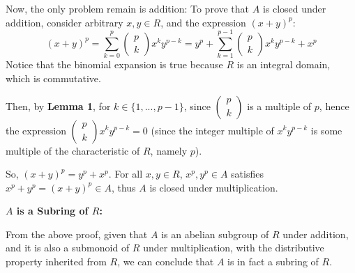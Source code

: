 \documentclass{article}
\begin{document}
Now, the only problem remain is addition: To prove that $A$ is closed under addition, consider arbitrary $x,y\in R$, and the expression $(x+y)^p$:
$$(x+y)^p = \sum_{k=0}^{p}\begin{pmatrix}
    p\\k
\end{pmatrix}x^ky^{p-k} = y^p + \sum_{k=1}^{p-1}\begin{pmatrix}
    p\\k
\end{pmatrix}x^ky^{p-k} + x^p$$
Notice that the binomial expansion is true because $R$ is an integral domain, which is commutative. 

Then, by \textbf{Lemma 1}, for $k\in\{1,...,p-1\}$, since $\begin{pmatrix}
    p\\k
\end{pmatrix}$ is a multiple of $p$, hence the expression $\begin{pmatrix}
    p\\k
\end{pmatrix}x^ky^{p-k}=0$ (since the integer multiple of $x^ky^{p-k}$ is some multiple of the characteristic of $R$, namely $p$).

So, $(x+y)^p = y^p + x^p$. For all $x,y\in R$, $x^p, y^p\in A$ satisfies $x^p+y^p = (x+y)^p \in A$, thus $A$ is closed under multiplication.

\hfill

\textbf{$A$ is a Subring of $R$:}

From the above proof, given that $A$ is an abelian subgroup of $R$ under addition, and it is also a submonoid of $R$ under multiplication,
with the distributive property inherited from $R$, we can conclude that $A$ is in fact a subring of $R$.
\end{document}
